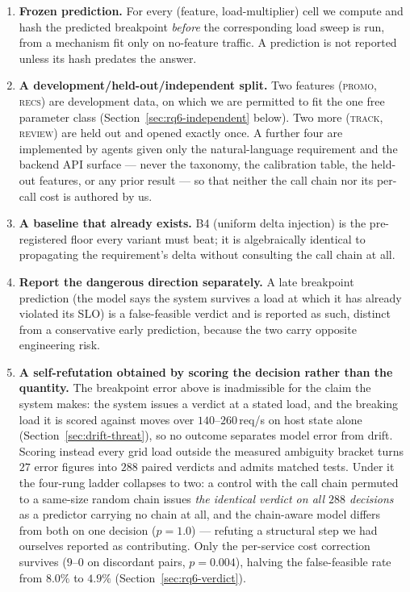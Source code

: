 \documentclass[journal, 10pt]{IEEEtran}
\begin{document}
\begin{enumerate}
    \item \textbf{Frozen prediction.} For every (feature, load-multiplier)
    cell we compute and hash the predicted breakpoint \emph{before} the
    corresponding load sweep is run, from a mechanism fit only on
    no-feature traffic. A prediction is not reported unless its hash
    predates the answer.
    \item \textbf{A development/held-out/independent split.} Two features
    (\textsc{promo}, \textsc{recs}) are development data, on which we are
    permitted to fit the one free parameter class (Section~\ref{sec:rq6-independent}
    below). Two more (\textsc{track}, \textsc{review}) are held out and
    opened exactly once. A further four are implemented by agents given only
    the natural-language requirement and the backend API surface --- never
    the taxonomy, the calibration table, the held-out features, or any prior
    result --- so that neither the call chain nor its per-call cost is
    authored by us.
    \item \textbf{A baseline that already exists.} B4 (uniform delta
    injection) is the pre-registered floor every variant must beat; it is
    algebraically identical to propagating the requirement's delta without
    consulting the call chain at all.
    \item \textbf{Report the dangerous direction separately.} A late
    breakpoint prediction (the model says the system survives a load at
    which it has already violated its SLO) is a false-feasible verdict and
    is reported as such, distinct from a conservative early prediction,
    because the two carry opposite engineering risk.
    \item \textbf{A self-refutation obtained by scoring the decision rather than the quantity.} The breakpoint error above is inadmissible for the claim the system makes: the system issues a verdict at a stated load, and the breaking load it is scored against moves over $140$--$260\,$req/s on host state alone (Section~\ref{sec:drift-threat}), so no outcome separates model error from drift. Scoring instead every grid load outside the measured ambiguity bracket turns $27$ error figures into $288$ paired verdicts and admits matched tests. Under it the four-rung ladder collapses to two: a control with the call chain permuted to a same-size random chain issues \emph{the identical verdict on all $288$ decisions} as a predictor carrying no chain at all, and the chain-aware model differs from both on one decision ($p=1.0$) --- refuting a structural step we had ourselves reported as contributing. Only the per-service cost correction survives ($9$--$0$ on discordant pairs, $p=0.004$), halving the false-feasible rate from $8.0\%$ to $4.9\%$ (Section~\ref{sec:rq6-verdict}).
\end{enumerate}
\end{document}
